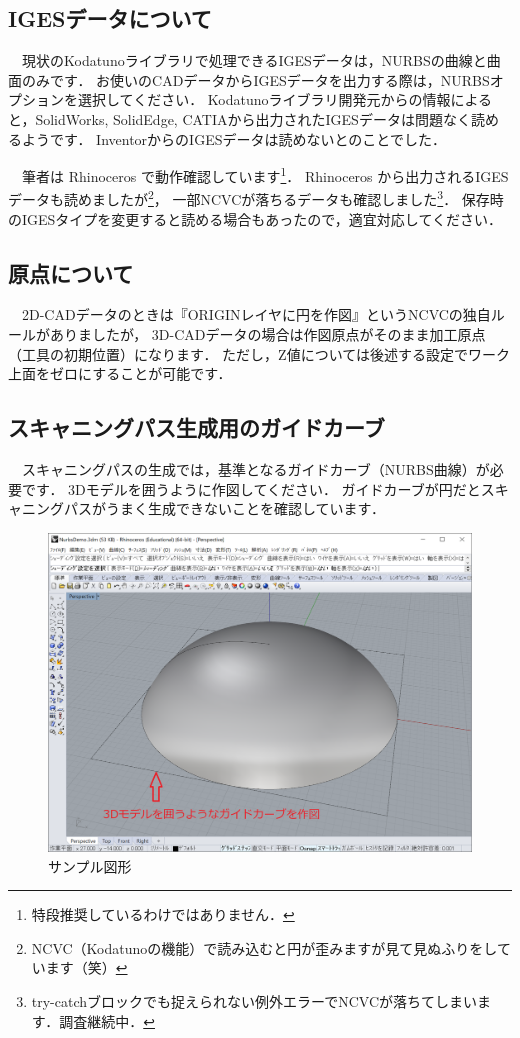 
\subsection{IGESデータについて}
\label{sec:AboutIGES}
　現状のKodatunoライブラリで処理できるIGESデータは，NURBSの曲線と曲面のみです．
お使いのCADデータからIGESデータを出力する際は，NURBSオプションを選択してください．
Kodatunoライブラリ開発元からの情報によると，SolidWorks, SolidEdge, CATIAから出力されたIGESデータは問題なく読めるようです．
InventorからのIGESデータは読めないとのことでした．

　筆者は Rhinoceros で動作確認しています\footnote{特段推奨しているわけではありません．}．
Rhinoceros から出力されるIGESデータも読めましたが\footnote{NCVC（Kodatunoの機能）で読み込むと円が歪みますが見て見ぬふりをしています（笑）}，
一部NCVCが落ちるデータも確認しました\footnote{try-catchブロックでも捉えられない例外エラーでNCVCが落ちてしまいます．調査継続中．}．
保存時のIGESタイプを変更すると読める場合もあったので，適宜対応してください．

\subsection{原点について}
　2D-CADデータのときは『ORIGINレイヤに円を作図』というNCVCの独自ルールがありましたが，
3D-CADデータの場合は作図原点がそのまま加工原点（工具の初期位置）になります．
ただし，Z値については後述する設定でワーク上面をゼロにすることが可能です．

\subsection{スキャニングパス生成用のガイドカーブ}
　スキャニングパスの生成では，基準となるガイドカーブ（NURBS曲線）が必要です．
3Dモデルを囲うように作図してください．
ガイドカーブが円だとスキャニングパスがうまく生成できないことを確認しています．

\begin{figure}[H]
\centering
\includegraphics[scale=0.5]{No1/fig/fig11.png}
\caption{サンプル図形}
\label{fig:sample.iges}
\end{figure}

